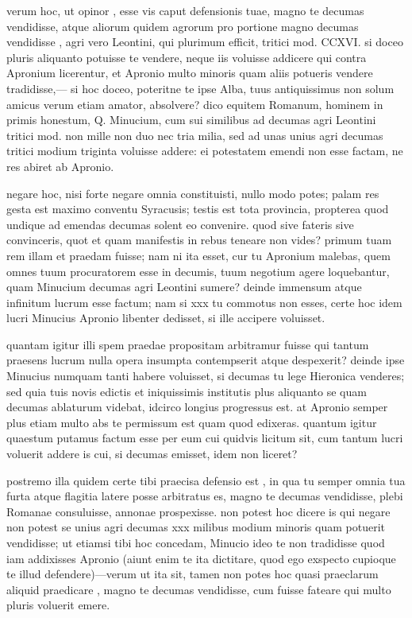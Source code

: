 verum hoc, ut opinor , esse vis caput defensionis tuae, magno te decumas vendidisse, atque aliorum quidem agrorum pro portione magno decumas vendidisse , agri vero Leontini, qui plurimum efficit, tritici mod. CCXVI. si doceo pluris aliquanto potuisse te vendere, neque iis voluisse addicere qui contra Apronium licerentur, et Apronio multo minoris quam aliis potueris vendere tradidisse,— si hoc doceo, poteritne te ipse Alba, tuus antiquissimus non solum amicus verum etiam amator, absolvere? dico equitem Romanum, hominem in primis honestum, Q. Minucium, cum sui similibus ad decumas agri Leontini tritici mod. non mille non duo nec tria milia, sed ad unas unius agri decumas tritici modium triginta voluisse addere: ei potestatem emendi non esse factam, ne res abiret ab Apronio.

 negare hoc, nisi forte negare omnia constituisti, nullo modo potes; palam res gesta est maximo conventu Syracusis; testis est tota provincia, propterea quod undique ad emendas decumas solent eo convenire. quod sive fateris sive convinceris, quot et quam manifestis in rebus teneare non vides? primum tuam rem illam et praedam fuisse; nam ni ita esset, cur tu Apronium malebas, quem omnes tuum procuratorem esse in decumis, tuum negotium agere loquebantur, quam Minucium decumas agri Leontini sumere? deinde immensum atque infinitum lucrum esse factum; nam si xxx tu commotus non esses, certe hoc idem lucri Minucius Apronio libenter dedisset, si ille accipere voluisset.

 quantam igitur illi spem praedae propositam arbitramur fuisse qui tantum praesens lucrum nulla opera insumpta contempserit atque despexerit? deinde ipse Minucius numquam tanti habere voluisset, si decumas tu lege Hieronica venderes; sed quia tuis novis edictis et iniquissimis institutis plus aliquanto se quam decumas ablaturum videbat, idcirco longius progressus est. at Apronio semper plus etiam multo abs te permissum est quam quod edixeras. quantum igitur quaestum putamus factum esse per eum cui quidvis licitum sit, cum tantum lucri voluerit addere is cui, si decumas emisset, idem non liceret?

 postremo illa quidem certe tibi praecisa defensio est , in qua tu semper omnia tua furta atque flagitia latere posse arbitratus es, magno te decumas vendidisse, plebi Romanae consuluisse, annonae prospexisse. non potest hoc dicere is qui negare non potest se unius agri decumas xxx milibus modium minoris quam potuerit vendidisse; ut etiamsi tibi hoc concedam, Minucio ideo te non tradidisse quod iam addixisses Apronio (aiunt enim te ita dictitare, quod ego exspecto cupioque te illud defendere)—verum ut ita sit, tamen non potes hoc quasi praeclarum aliquid praedicare , magno te decumas vendidisse, cum fuisse fateare qui multo pluris voluerit emere.

